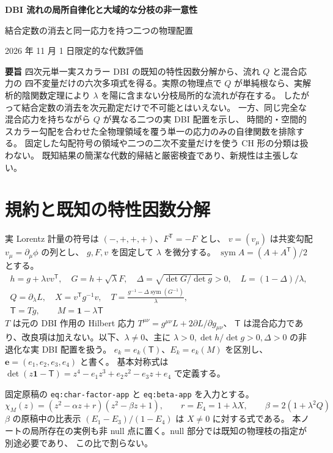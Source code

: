 \documentclass[11pt,a4paper]{article}
\newcommand{\sym}{\operatorname{sym}}
\newcommand{\Id}{\mathbf{1}}
\newcommand{\Tmix}{\mathsf T}
\newcommand{\ee}{\boldsymbol e}
\begin{document}
\begin{center}
{\Large\bfseries DBI 流れの局所自律化と大域的な分枝の非一意性}\par
\vspace{4pt}
{\large 結合定数の消去と同一応力を持つ二つの物理配置}\par
\vspace{4pt}
2026 年 11 月 1 日\quad 限定的な代数評価
\end{center}
\noindent\textbf{要旨}\quad
四次元単一実スカラー DBI の既知の特性因数分解から、流れ $Q$ と混合応力の
四不変量だけの六次多項式を得る。実際の物理点で $Q$ が単純根なら、実解析的陰関数定理により
$\lambda$ を陽に含まない分枝局所的な流れが存在する。
したがって結合定数の消去を次元勘定だけで不可能とはいえない。
一方、同じ完全な混合応力を持ちながら $Q$ が異なる二つの実 DBI 配置を示し、
時間的・空間的スカラー勾配を合わせた全物理領域を覆う単一の応力のみの自律関数を排除する。
固定した勾配符号の領域や二つの二次不変量だけを使う CH 形の分類は扱わない。
既知結果の簡潔な代数的帰結と厳密検査であり、新規性は主張しない。

\section{規約と既知の特性因数分解}
実 Lorentz 計量の符号は $(-,+,+,+)$、$F^{\mathsf T}=-F$ とし、
$v=(v_\mu)$ は共変勾配 $v_\mu=\partial_\mu\phi$ の列とし、
$g,F,v$ を固定して $\lambda$ を微分する。
$\sym A=(A+A^{\mathsf T})/2$ とする。
\begin{equation}\label{eq:def}
\begin{gathered}
h=g+\lambda vv^{\mathsf T},\quad G=h+\sqrt\lambda F,\quad
\Delta=\sqrt{\det G/\det g}>0,\quad L=(1-\Delta)/\lambda,\\
Q=\partial_\lambda L,\quad X=v^{\mathsf T}g^{-1}v,\quad
T=\frac{g^{-1}-\Delta\sym(G^{-1})}{\lambda},\\
\Tmix=Tg,\qquad M=\Id-\lambda\Tmix
\end{gathered}
\end{equation}
$T$ は元の DBI 作用の Hilbert 応力
$T^{\mu\nu}=g^{\mu\nu}L+2\partial L/\partial g_{\mu\nu}$、
$\Tmix$ は混合応力であり、改良項は加えない。以下、$\lambda\ne0$、主に
$\lambda>0,\det h/\det g>0,\Delta>0$ の非退化な実 DBI 配置を扱う。
$e_k=e_k(\Tmix)$、$E_k=e_k(M)$ を区別し、$\ee=(e_1,e_2,e_3,e_4)$ と書く。
基本対称式は $\det(z\Id-\Tmix)=z^4-e_1z^3+e_2z^2-e_3z+e_4$ で定義する。

固定原稿の \texttt{eq:char-factor-app} と \texttt{eq:beta-app} を入力とする。
\begin{equation}\label{eq:factor}
\chi_M(z)=(z^2-\alpha z+r)(z^2-\beta z+1),\qquad
r=E_4=1+\lambda X,\qquad \beta=2(1+\lambda^2Q)
\end{equation}
$\beta$ の原稿中の比表示 $(E_1-E_3)/(1-E_4)$ は $X\ne0$ に対する式である。
本ノートの局所存在の実例も非 null 点に置く。null 部分では既知の物理枝の指定が別途必要であり、
この比で割らない。
\end{document}

